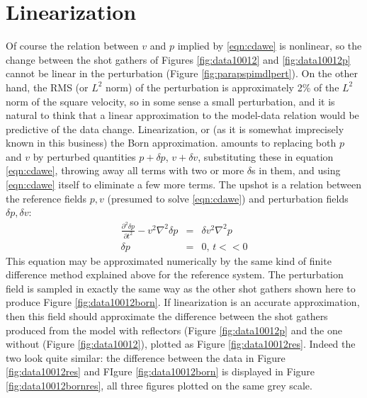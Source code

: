 \section{Linearization}
Of course the relation between $v$ and $p$ implied by \ref{eqn:cdawe} is nonlinear, so the change between the shot gathers of Figures \ref{fig:data10012} and \ref{fig:data10012p} cannot be linear in the perturbation (Figure \ref{fig:parapspimdlpert}). On the other hand, the RMS (or $L^2$ norm) of the perturbation is approximately 2\% of the $L^2$ norm of the square velocity, so in some sense a small perturbation, and it is natural to think that a linear approximation to the model-data relation would be predictive of the data change. Linearization, or (as it is somewhat imprecisely known in this business) the Born approximation. amounts to replacing both $p$ and $v$ by perturbed quantities $p + \delta p$, $v+\delta v$, substituting these in equation \ref{eqn:cdawe}, throwing away all terms with two or more $\delta$s in them, and using \ref{eqn:cdawe} itself to eliminate a few more terms. The upshot is a relation between the reference fields $p, v$ (presumed to solve \ref{eqn:cdawe}) and perturbation fields $\delta p, \delta v$:
\begin{eqnarray}
\label{eqn:pcdawe}
\frac{\partial^2 \delta p}{\partial t^2} -v^2 \nabla^2 \delta p& = & \delta v^2 \nabla^2 p\\
\delta p &= & 0, \,t<<0 \nonumber 
\end{eqnarray} 
This equation may be approximated numerically by the same kind of finite difference method explained above for the reference system. The perturbation field  is sampled in exactly the same way as the other shot gathers shown here to produce Figure \ref{fig:data10012born}. If linearization is an accurate approximation, then this field should approximate the difference between the shot gathers produced from the model with reflectors (Figure \ref{fig:data10012p} and the one without (Figure \ref{fig:data10012}), plotted as Figure \ref{fig:data10012res}. Indeed the two look quite similar: the difference between the data in Figure \ref{fig:data10012res} and FIgure \ref{fig:data10012born} is displayed in Figure \ref{fig:data10012bornres}, all three figures plotted on the same grey scale.


